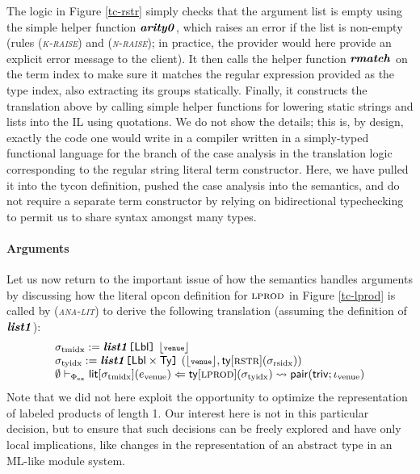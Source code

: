 \documentclass[9pt,preprint]{sigplanconf}
\newcommand{\rulename}[1]{({\textsc{\textsl{#1}}})}
\begin{document}
The logic in Figure \ref{tc-rstr} simply checks that the argument list is empty using the simple helper function ${\textbf{\textit{arity0}}}$, which raises an error if the list is non-empty (rules \rulename{k-raise} and \rulename{n-raise}; in practice, the provider would here provide an explicit error message to the client). It then calls the helper function ${\textbf{\textit{rmatch}}}$ on the term index to make sure it matches the regular expression provided as the type index, also extracting its groups statically. Finally, it constructs the translation above by calling simple helper functions for lowering static strings and lists into the IL using quotations. We do not show the details; this is, by design, exactly the code one would write in a compiler written in a simply-typed functional language for the branch of the case analysis in the translation logic corresponding to the regular string literal term constructor. Here, we have pulled it into the tycon definition, pushed the case analysis into the semantics, and do not require a separate term constructor by relying on bidirectional typechecking to permit us to share syntax amongst many types.%

\paragraph{Arguments} Let us now return to the important issue of how the semantics handles arguments by discussing how the literal opcon definition for $\textsc{lprod}$ in Figure \ref{tc-lprod} is called by \rulename{ana-lit} to derive the following translation (assuming the definition of ${\textbf{\textit{list1}}}$):
\footnotesize\[\begin{array}{l}
\stx{tmidx} := \skap{\klbl}{\svar{list1}}~\desugar{\conclbl{venue}}\\
\stx{tyidx} := \conckap{\svar{list1}}{\kprod{\klbl}{\kty}}~(\desugar{\conclbl{venue}}, \sty{\tcvar{rstr}}{\stx{rsidx}})\\
\eana{\emptyset}{\Phi_\text{ex}}{\elit{\stx{tmidx}}{e_\text{venue}}}{\sty{\tcvar{lprod}}{\stx{tyidx}}}{\ipair{\itriv}{\iota_\text{venue}}}
\end{array}\]
\normalsize
Note that we did not here exploit the opportunity to optimize the representation of labeled products of length 1. Our interest here is not in this particular decision,  but to ensure that such decisions can be freely explored and have only local implications, like changes in the representation of an abstract type in an ML-like module system. 
\end{document}

